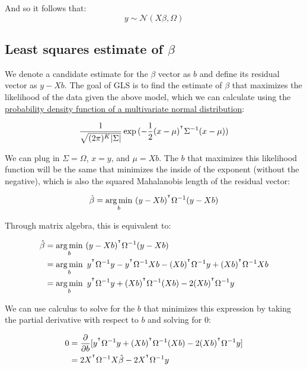 \documentclass[12pt]{article}
\begin{document}
And so it follows that:
$$ y \sim \mathcal{N} (X \beta, \Omega) $$





\subsection[Least squares estimate of beta]{Least squares estimate of $\beta$}

We denote a candidate estimate for the $\beta$ vector as $b$ and define its residual vector as $ y - X b $. The goal of GLS is to find the estimate of $\beta$ that maximizes the likelihood of the data given the above model, which we can calculate using the \href{https://en.wikipedia.org/wiki/Multivariate_normal_distribution}{probability density function of a multivariate normal distribution}:

$$
\frac{1}{\sqrt{(2 \pi)^K |\Sigma| }}
\exp{(-\frac{1}{2}(x - \mu)^{^\intercal} \Sigma^{-1} (x - \mu))}
$$

We can plug in $\Sigma = \Omega$, $x = y$, and $\mu = X b$. The $b$ that maximizes this likelihood function will be the same that minimizes the inside of the exponent (without the negative), which is also the squared Mahalanobis length of the residual vector:

$$ \hat{\beta} = \operatorname*{arg\,min}_b ~ (y - Xb)^{^\intercal} \Omega^{-1} (y - Xb) $$

Through matrix algebra, this is equivalent to:

\begin{align*}
    \hat{\beta} &= \operatorname*{arg\,min}_b ~ (y - Xb)^{^\intercal} \Omega^{-1} (y - Xb) \\
    &= \operatorname*{arg\,min}_b ~ y^{^\intercal} \Omega^{-1} y - y^{^\intercal} \Omega^{-1} Xb - (Xb)^{^\intercal} \Omega^{-1} y + (Xb)^{^\intercal} \Omega^{-1} Xb \\
    &= \operatorname*{arg\,min}_b ~ y^{^\intercal} \Omega^{-1} y + (Xb)^{^\intercal} \Omega^{-1} (Xb) - 2(Xb)^{^\intercal} \Omega^{-1} y
\end{align*}

We can use calculus to solve for the $b$ that minimizes this expression by taking the partial derivative with respect to $b$ and solving for 0:

\begin{align*}
    0 &= \frac{\partial}{\partial b} [ y^{^\intercal} \Omega^{-1} y + (Xb)^{^\intercal} \Omega^{-1} (Xb) - 2(Xb)^{^\intercal} \Omega^{-1} y ]\\
    &=  2X^{^\intercal} \Omega^{-1} X \hat{\beta} - 2X^{^\intercal} \Omega^{-1} y
\end{align*}
\end{document}

